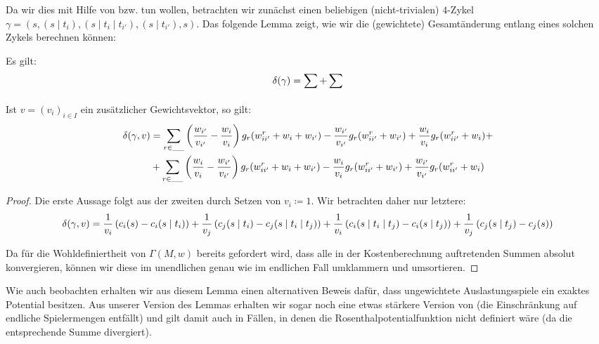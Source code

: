 Da wir dies mit Hilfe von  bzw.  tun wollen, betrachten wir zunächst einen beliebigen (nicht-trivialen) $4$-Zykel $\gamma = (s, (s\mid t_i), (s \mid t_i \mid t_{i'}), (s \mid t_{i'}), s)$. Das folgende Lemma zeigt, wie wir die (gewichtete) Gesamtänderung entlang eines solchen Zykels berechnen können:

\newcommand{\wrestr}{w^r_{ii'}}

\begin{lemma}
	Es gilt:
		\begin{align} 
			\delta(\gamma) = \sum_{} + \sum_{} \label{eq:PfadAendUngew}
		\end{align}
	Ist $v = (v_i)_{i \in I}$ ein zusätzlicher Gewichtsvektor, so gilt:
		\begin{align}\begin{split}\label{eq:PfadAendGew}
			\PfadAend(\gamma, v) &= \sum_{r \in \_\_} \left(\frac{w_{i'}}{v_{i'}} - \frac{w_i}{v_i}\right) g_r(\wrestr + w_i + w_{i'}) - \frac{w_{i'}}{v_{i'}} g_r(\wrestr + w_{i'})  + \frac{w_i}{v_i} g_r(\wrestr + w_i) +\\
								&+ \sum_{r \in \_\_} \left(\frac{w_i}{v_i} - \frac{w_{i'}}{v_{i'}}\right) g_r(\wrestr + w_i + w_{i'}) - \frac{w_i}{v_i} g_r(\wrestr + w_{i'}) + \frac{w_{i'}}{v_{i'}} g_r(\wrestr + w_i)
		\end{split}\end{align}
\end{lemma}

\begin{proof}
	Die erste Aussage folgt aus der zweiten durch Setzen von $v_i \coloneqq 1$. Wir betrachten daher nur letztere:
		\begin{align*}
			\delta(\gamma, v) = \frac{1}{v_i}\left(c_i(s) - c_i(s\mid t_i)\right) + \frac{1}{v_j}\left(c_j(s\mid t_i) - c_j(s\mid t_i\mid t_j)\right) + \frac{1}{v_i}\left(c_i(s\mid t_i\mid t_j) - c_i(s\mid t_j)\right) + \frac{1}{v_j}\left(c_j(s\mid t_j) - c_j(s)\right)
		\end{align*}
		
		
		Da für die Wohldefiniertheit von $\Gamma(M, w)$ bereits gefordert wird, dass alle in der Kostenberechnung auftretenden Summen absolut konvergieren, können wir diese im unendlichen genau wie im endlichen Fall umklammern und umsortieren.
\end{proof}

Wie auch \citeauthor{CharExGewPotinWCG} beobachten erhalten wir aus diesem Lemma einen alternativen Beweis dafür, dass ungewichtete Auslastungsspiele ein exaktes Potential besitzen. Aus unserer Version des Lemmas erhalten wir sogar noch eine etwas stärkere Version von  (die Einschränkung auf endliche Spielermengen entfällt) und gilt damit auch in Fällen, in denen die Rosenthalpotentialfunktion nicht definiert wäre (da die entsprechende Summe divergiert).

